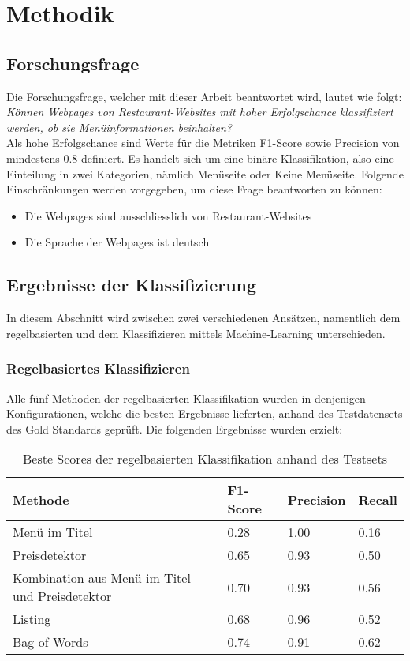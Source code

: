 \chapter{Methodik}
\section{Forschungsfrage}
Die Forschungsfrage, welcher mit dieser Arbeit beantwortet wird, lautet wie folgt:\\

\emph{Können Webpages von Restaurant-Websites mit hoher Erfolgschance klassifiziert werden, ob sie Menüinformationen beinhalten?}\\

Als hohe Erfolgschance sind Werte für die Metriken \glqq F1-Score\grqq{} sowie \glqq Precision\grqq{} von mindestens 0.8 definiert.
Es handelt sich um eine binäre Klassifikation, also eine Einteilung in zwei Kategorien, nämlich \glqq Menüseite\grqq{} oder \glqq Keine Menüseite\grqq.
Folgende Einschränkungen werden vorgegeben, um diese Frage beantworten zu können:
\begin{itemize}
	\item Die Webpages sind ausschliesslich von Restaurant-Websites
	\item Die Sprache der Webpages ist deutsch
\end{itemize}
\section{Ergebnisse der Klassifizierung}
In diesem Abschnitt wird zwischen zwei verschiedenen Ansätzen, namentlich dem regelbasierten und dem Klassifizieren mittels Machine-Learning unterschieden.
\subsection{Regelbasiertes Klassifizieren}
Alle fünf Methoden der regelbasierten Klassifikation wurden in denjenigen Konfigurationen, welche die besten Ergebnisse lieferten, anhand des Testdatensets des Gold Standards geprüft.
Die folgenden Ergebnisse wurden erzielt:\\

\begin{table}[H]
	\caption{Beste Scores der regelbasierten Klassifikation anhand des Testsets}
	\centering
	\begin{tabular}{|l|l|l|l|}
		\hline
		Methode & F1-Score & Precision & Recall\\
		\hline
		Menü im Titel & 0.28 & 1.00 & 0.16 \\
		Preisdetektor & 0.65 & 0.93 & 0.50 \\
		Kombination aus Menü im Titel und Preisdetektor & 0.70 & 0.93 & 0.56\\
		Listing & 0.68 & 0.96 & 0.52\\
		Bag of Words & 0.74 & 0.91 & 0.62\\
		\hline
	\end{tabular}
\end{table}



